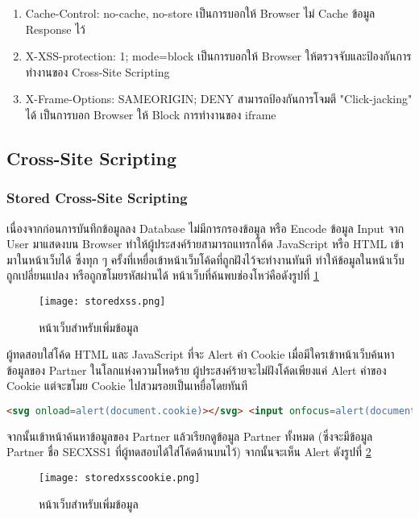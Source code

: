 \begin{enumerate}
	\item Cache-Control: no-cache, no-store เป็นการบอกให้ Browser ไม่ Cache ข้อมูล Response ไว้
	\item X-XSS-protection: 1; mode=block เป็นการบอกให้ Browser ให้ตรวจจับและป้องกันการทำงานของ Cross-Site Scripting
	\item X-Frame-Options: SAMEORIGIN; DENY สามารถป้องกันการโจมตี "Click-jacking" ได้ เป็นการบอก Browser ให้ Block การทำงานของ iframe
\end{enumerate}

\subsection{Cross-Site Scripting}

\subsubsection{Stored Cross-Site Scripting}

เนื่องจากก่อนการบันทึกข้อมูลลง Database ไม่มีการกรองข้อมูล หรือ Encode ข้อมูล Input จาก User มาแสดงบน Browser ทำให้ผู้ประสงค์ร้ายสามารถแทรกโค้ด JavaScript หรือ HTML เข้ามาในหน้าเว็บได้ ซึ่งทุก ๆ ครั้งที่เหยื่อเข้าหน้าเว็บโค้ดที่ถูกฝังไว้จะทำงานทันที ทำให้ข้อมูลในหน้าเว็บถูกเปลี่ยนแปลง หรือถูกขโมยรหัสผ่านได้ หน้าเว็บที่ค้นพบช่องโหว่คือดังรูปที่ \ref{Fig:storedxss.png}

\begin{figure}[h]
	\centering
	\texttt{[image: storedxss.png]}
	\caption{หน้าเว็บสำหรับเพิ่มข้อมูล}
	\label{Fig:storedxss.png}
\end{figure}

ผู้ทดสอบใส่โค้ด HTML และ JavaScript ที่จะ Alert ค่า Cookie เมื่อมีใครเข้าหน้าเว็บค้นหาข้อมูลของ Partner ในโลกแห่งความโหดร้าย ผู้ประสงค์ร้ายจะไม่ฝังโค้ดเพียงแค่ Alert ค่าของ Cookie แต่จะขโมย Cookie ไปสวมรอยเป็นเหยื่อโดยทันที

 \begin{lstlisting}[language=html,numbers=none] 
<svg onload=alert(document.cookie)></svg> <input onfocus=alert(document.cookie) autofocus>
\end{lstlisting}

จากนั้นเข้าหน้าค้นหาข้อมูลของ Partner แล้วเรียกดูข้อมูล Partner ทั้งหมด (ซึ่งจะมีข้อมูล Partner ชื่อ SECXSS1 ที่ผู้ทดสอบได้ใส่โค้ดด้านบนไว้) จากนั้นจะเห็น Alert ดังรูปที่ \ref{Fig:storedxsscookie.png}

\begin{figure}[h]
	\centering
	\texttt{[image: storedxsscookie.png]}
	\caption{หน้าเว็บสำหรับเพิ่มข้อมูล}
	\label{Fig:storedxsscookie.png}
\end{figure}

